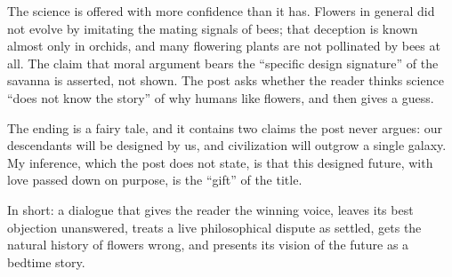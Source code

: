 \begin{afterword}
The science is offered with more confidence than it has. Flowers in general did not evolve by imitating the mating signals of bees; that deception is known almost only in orchids, and many flowering plants are not pollinated by bees at all. The claim that moral argument bears the ``specific design signature'' of the savanna is asserted, not shown. The post asks whether the reader thinks science ``does not know the story'' of why humans like flowers, and then gives a guess.

The ending is a fairy tale, and it contains two claims the post never argues: our descendants will be designed by us, and civilization will outgrow a single galaxy. My inference, which the post does not state, is that this designed future, with love passed down on purpose, is the ``gift'' of the title.

In short: a dialogue that gives the reader the winning voice, leaves its best objection unanswered, treats a live philosophical dispute as settled, gets the natural history of flowers wrong, and presents its vision of the future as a bedtime story.
\end{afterword}

